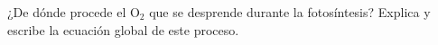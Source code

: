 ¿De dónde procede el O$_2$ que se desprende durante
la fotosíntesis? Explica y escribe la ecuación global
de este proceso.

\begin{solutionbox}{3cm}

\end{solutionbox}
